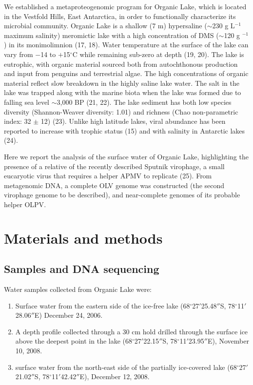 We established a metaproteogenomic program for Organic Lake, which is located in the Vestfold Hills, East Antarctica, in order to functionally characterize its microbial community. 
Organic Lake is a shallow (7 m) hypersaline ($\sim$230 g L$^{-1}$ maximum salinity) meromictic lake with a high concentration of \ac{DMS} ($\sim$120 \textmu{}g $^{-1}$) in its monimolimnion (17, 18). 
Water temperature at the surface of the lake can vary from $-$14 to $+$15$^{\circ}$C while remaining sub-zero at depth (19, 20). 
The lake is eutrophic, with organic material sourced both from autochthonous production and input from penguins and terrestrial algae. 
The high concentrations of organic material reflect slow breakdown in the highly saline lake water. 
The salt in the lake was trapped along with the marine biota when the lake was formed due to falling sea level $\sim$3,000 BP (21, 22). 
The lake sediment has both low species diversity (Shannon-Weaver diversity: 1.01) and richness (Chao non-parametric index: 32 $\pm$ 12) (23). 
Unlike high latitude lakes, viral abundance has been reported to increase with trophic status (15) and with salinity in Antarctic lakes (24). 

Here we report the analysis of the surface water of Organic Lake, highlighting the presence of a relative of the recently described Sputnik virophage, a small eucaryotic virus that requires a helper \ac{APMV} to replicate (25). 
From metagenomic \textsc{DNA}, a complete \ac{OLV} genome was constructed (the second virophage genome to be described), and near-complete genomes of its probable helper \ac{OLPV}.


\section{Materials and methods}

\subsection{Samples and DNA sequencing}
Water samples collected from Organic Lake were: 

\begin{enumerate}
\item Surface water from the eastern side of the ice-free lake (68$^{\circ}$27$'$25.48$''$S, 78$^{\circ}$11$'$28.06$''$E) December 24, 2006.
\item A depth profile collected through a 30 cm hold drilled through the surface ice above the deepest point in the lake (68$^{\circ}$27$'$22.15$''$S, 78$^{\circ}$11$'$23.95$''$E), November 10, 2008. 
\item surface water from the north-east side of the partially ice-covered lake (68$^{\circ}$27$'$21.02$''$S, 78$^{\circ}$11$'$42.42$''$E), December 12, 2008. 
\end{enumerate}

